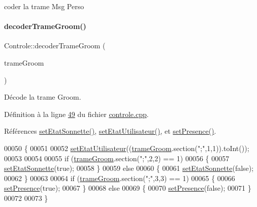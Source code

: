coder la trame Msg Perso 

\mbox{\label{class_controle_a2dcdd01e67e6ce8769188d62ce0c262a}} 
\paragraph{\texorpdfstring{decoder\+Trame\+Groom()}{decoderTrameGroom()}}
{\footnotesize\ttfamily Controle\+::decoder\+Trame\+Groom (\begin{DoxyParamCaption}\item[{Q\+String}]{trame\+Groom }\end{DoxyParamCaption})\hspace{0.3cm}{\ttfamily [private]}}



Décode la trame Groom. 



Définition à la ligne \hyperlink{controle_8cpp_source_l00049}{49} du fichier \hyperlink{controle_8cpp_source}{controle.\+cpp}.



Références \hyperlink{controle_8cpp_source_l00028}{set\+Etat\+Sonnette()}, \hyperlink{controle_8cpp_source_l00018}{set\+Etat\+Utilisateur()}, et \hyperlink{controle_8cpp_source_l00038}{set\+Presence()}.


\begin{DoxyCode}
00050 \{
00051 
00052     \hyperlink{class_controle_a62db54114d126d03dd332332b3942320}{setEtatUtilisateur}((\hyperlink{class_controle_a5b9512ebbaf16746f55a9519de88f9be}{trameGroom}.section(\textcolor{stringliteral}{";"},1,1)).toInt());
00053 
00054 
00055     \textcolor{keywordflow}{if} (\hyperlink{class_controle_a5b9512ebbaf16746f55a9519de88f9be}{trameGroom}.section(\textcolor{stringliteral}{";"},2,2) == 1)
00056     \{
00057         \hyperlink{class_controle_ac706c5e9ede46dab70631281b084e233}{setEtatSonnette}(\textcolor{keyword}{true});
00058     \}
00059     \textcolor{keywordflow}{else}
00060     \{
00061         \hyperlink{class_controle_ac706c5e9ede46dab70631281b084e233}{setEtatSonnette}(\textcolor{keyword}{false});
00062     \}
00063 
00064     \textcolor{keywordflow}{if} (\hyperlink{class_controle_a5b9512ebbaf16746f55a9519de88f9be}{trameGroom}.section(\textcolor{stringliteral}{";"},3,3) == 1)
00065     \{
00066         \hyperlink{class_controle_a65904fe693663759a4cde4e4d66e36e8}{setPresence}(\textcolor{keyword}{true});
00067     \}
00068     \textcolor{keywordflow}{else}
00069     \{
00070         \hyperlink{class_controle_a65904fe693663759a4cde4e4d66e36e8}{setPresence}(\textcolor{keyword}{false});
00071     \}
00072 
00073 \}
\end{DoxyCode}
\mbox{\label{class_controle_acabf3768430c7f1acb268ca0fa1ddf99}} 

